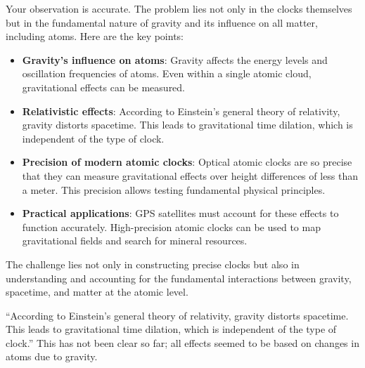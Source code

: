 \documentclass[a4paper,12pt]{article}
\begin{document}
	Your observation is accurate. The problem lies not only in the clocks themselves but in the fundamental nature of gravity and its influence on all matter, including atoms. Here are the key points:
	\begin{itemize}
		\item \textbf{Gravity's influence on atoms}: Gravity affects the energy levels and oscillation frequencies of atoms. Even within a single atomic cloud, gravitational effects can be measured.
		\item \textbf{Relativistic effects}: According to Einstein's general theory of relativity, gravity distorts spacetime. This leads to gravitational time dilation, which is independent of the type of clock.
		\item \textbf{Precision of modern atomic clocks}: Optical atomic clocks are so precise that they can measure gravitational effects over height differences of less than a meter. This precision allows testing fundamental physical principles.
		\item \textbf{Practical applications}: GPS satellites must account for these effects to function accurately. High-precision atomic clocks can be used to map gravitational fields and search for mineral resources.
	\end{itemize}
	The challenge lies not only in constructing precise clocks but also in understanding and accounting for the fundamental interactions between gravity, spacetime, and matter at the atomic level.
	
	``According to Einstein's general theory of relativity, gravity distorts spacetime. This leads to gravitational time dilation, which is independent of the type of clock.'' This has not been clear so far; all effects seemed to be based on changes in atoms due to gravity.
	
\end{document}
